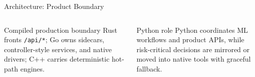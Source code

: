 \documentclass[aspectratio=169,10pt]{beamer}
\newcommand{\source}[1]{%
}
\begin{document}
\begin{frame}{Architecture: Product Boundary}
  \vspace{0.25cm}
  \begin{columns}[T,totalwidth=\textwidth]
    \begin{block}{Compiled production boundary}
      Rust fronts \texttt{/api/*}; Go owns sidecars, controller-style services, and native drivers; C++ carries deterministic hot-path engines.
    \end{block}
    \begin{exampleblock}{Python role}
      Python coordinates ML workflows and product APIs, while risk-critical decisions are mirrored or moved into native tools with graceful fallback.
    \end{exampleblock}
  \end{columns}
  \source{\texttt{README.md}; \texttt{docs/adr/0003-native-production-boundary.md}; \texttt{docs/architecture.md}.}
\end{frame}
\end{document}
